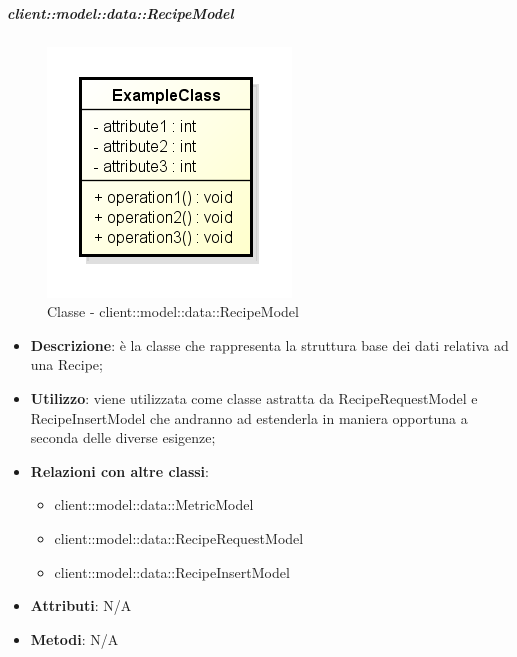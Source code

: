 		\subparagraph{client::model::data::RecipeModel} %
		\label{subp:client_model_data_recipe}
			\begin{figure}[htbp]
				\centering
				\centerline{\includegraphics[scale=0.7]{./images/client/classes/example_class.png}}
				\caption{Classe - client::model::data::RecipeModel}
			\end{figure}
			\begin{itemize}
				\item \textbf{Descrizione}: è la classe che rappresenta la struttura base dei dati relativa ad una Recipe;
				\item \textbf{Utilizzo}: viene utilizzata come classe astratta da RecipeRequestModel e RecipeInsertModel che andranno ad estenderla in maniera opportuna a seconda delle diverse esigenze;
				\item \textbf{Relazioni con altre classi}:
					\begin{itemize}
						\item client::model::data::MetricModel
						\item client::model::data::RecipeRequestModel
						\item client::model::data::RecipeInsertModel
					\end{itemize}
				\item \textbf{Attributi}: N/A
				\item \textbf{Metodi}: N/A
			\end{itemize}


